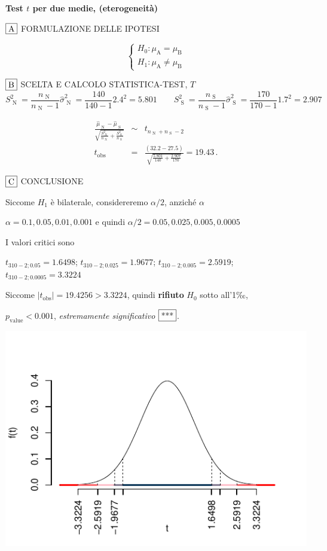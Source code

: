 \documentclass[
  11pt,
]{book}
\theoremstyle{mytheoremstyle}
\theoremstyle{mydefstyle}
\newenvironment{sol}
  {
  \begin{tcolorbox}[enhanced,breakable,arc=0.1mm,boxrule=1pt,colback=white,colframe=iblue,
  title=\bf \fontfamily{lmss}\selectfont \hspace{.5 cm} Soluzione,drop fuzzy shadow]

}{
\end{tcolorbox}
  }
\begin{document}
\begin{sol}
\textbf{Test \(t\) per due medie, (eterogeneità)}

\(\fbox{A}\) FORMULAZIONE DELLE IPOTESI

\[\begin{cases}
   H_0: \mu_\text{A} = \mu_\text{B} \\
   H_1: \mu_\text{A} \neq \mu_\text{B} 
   \end{cases}\]

\(\fbox{B}\) SCELTA E CALCOLO STATISTICA-TEST, \(T\)
\[
     S^2_\text{ N }=\frac{n_\text{ N }}{n_\text{ N }-1}\hat\sigma^2_\text{ N }=\frac{ 140 }{ 140 -1} 2.4 ^2= 5.801  \qquad
     S^2_\text{ S }=\frac{n_\text{ S }}{n_\text{ S }-1}\hat\sigma^2_\text{ S }=\frac{ 170 }{ 170 -1} 1.7 ^2= 2.907 
   \]

\begin{eqnarray*}
   \frac{\hat\mu_\text{ N } - \hat\mu_\text{ S }}
   {\sqrt{\frac {S^2_\text{ N }}{n_\text{ N }}+\frac {S^2_\text{ S }}{n_\text{ S }}}}&\sim&t_{n_\text{ N }+n_\text{ S }-2}\\
   t_{\text{obs}}
   &=& \frac{ ( 32.2 -  27.5 )} {\sqrt{\frac{ 5.801 }{ 140 }+\frac{ 2.907 }{ 170 }}}
   =   19.43 \, .
   \end{eqnarray*}

\(\fbox{C}\) CONCLUSIONE

Siccome \(H_1\) è bilaterale, considereremo \(\alpha/2\),
anziché \(\alpha\)

\(\alpha=0.1, 0.05, 0.01, 0.001\) e quindi \(\alpha/2=0.05, 0.025, 0.005, 0.0005\)

I valori critici sono

\(t_{310-2;0.05}=1.6498\); \(t_{310-2;0.025}=1.9677\); \(t_{310-2;0.005}=2.5919\); \(t_{310-2;0.0005}=3.3224\)

Siccome \(|t_\text{obs}|=19.4256>3.3224\), quindi \textbf{rifiuto} \(H_0\) sotto all'1‰,

\(p_\text{value}<0.001\), \emph{estremamente significativo} \(\fbox{***}\).

\begin{center}\includegraphics{Esami_passati_con_soluzioni_files/figure-latex/2022-33-1} \end{center}


\end{sol}
\end{document}
